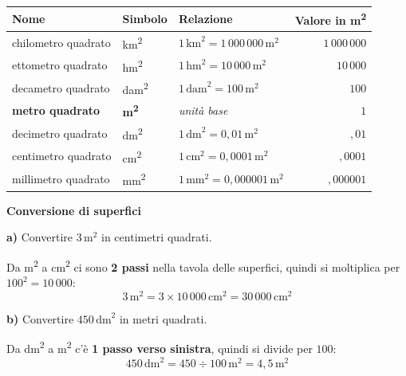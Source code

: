 \begin{center}
    \begin{tabular}{lllr}
        \toprule
        \textbf{Nome}           & \textbf{Simbolo}              & \textbf{Relazione}                         & \textbf{Valore in m\textsuperscript{2}} \\
        \midrule
        chilometro quadrato     & km\textsuperscript{2}         & $1\,\text{km}^2 = 1\,000\,000\,\text{m}^2$ & $1\,000\,000$                           \\
        ettometro quadrato      & hm\textsuperscript{2}         & $1\,\text{hm}^2 = 10\,000\,\text{m}^2$     & $10\,000$                               \\
        decametro quadrato      & dam\textsuperscript{2}        & $1\,\text{dam}^2 = 100\,\text{m}^2$        & $100$                                   \\
        \textbf{metro quadrato} & \textbf{m\textsuperscript{2}} & \textit{unità base}                        & $1$                                     \\
        decimetro quadrato      & dm\textsuperscript{2}         & $1\,\text{dm}^2 = 0{,}01\,\text{m}^2$      & ${,}01$                                 \\
        centimetro quadrato     & cm\textsuperscript{2}         & $1\,\text{cm}^2 = 0{,}0001\,\text{m}^2$    & ${,}0001$                               \\
        millimetro quadrato     & mm\textsuperscript{2}         & $1\,\text{mm}^2 = 0{,}000001\,\text{m}^2$  & ${,}000001$                             \\
        \bottomrule
    \end{tabular}
\end{center}

\begin{esempio}
    \textbf{Conversione di superfici}

    \medskip
    \textbf{a)} Convertire $3\,\text{m}^2$ in centimetri quadrati.

    Da m\textsuperscript{2} a cm\textsuperscript{2} ci sono \textbf{2 passi} nella tavola delle superfici, quindi si moltiplica per $100^2 = 10\,000$:
    \[
        3\,\text{m}^2 = 3 \times 10\,000\,\text{cm}^2 = 30\,000\,\text{cm}^2
    \]

    \medskip
    \textbf{b)} Convertire $450\,\text{dm}^2$ in metri quadrati.

    Da dm\textsuperscript{2} a m\textsuperscript{2} c'è \textbf{1 passo verso sinistra}, quindi si divide per $100$:
    \[
        450\,\text{dm}^2 = 450 \div 100\,\text{m}^2 = 4{,}5\,\text{m}^2
    \]
\end{esempio}

